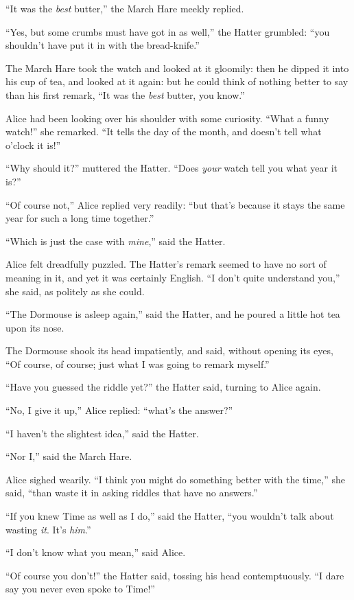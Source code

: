 \documentclass[book, 20pt]{extbook}
\begin{document}
``It was the \emph{best} butter,'' the March Hare meekly replied.

``Yes, but some crumbs must have got in as well,'' the Hatter grumbled:
``you shouldn't have put it in with the bread-knife.''

The March Hare took the watch and looked at it gloomily: then he dipped
it into his cup of tea, and looked at it again: but he could think of
nothing better to say than his first remark, ``It was the \emph{best}
butter, you know.''

Alice had been looking over his shoulder with some curiosity. ``What a
funny watch!'' she remarked. ``It tells the day of the month, and
doesn't tell what o'clock it is!''

``Why should it?'' muttered the Hatter. ``Does \emph{your} watch tell
you what year it is?''

``Of course not,'' Alice replied very readily: ``but that's because it
stays the same year for such a long time together.''

``Which is just the case with \emph{mine},'' said the Hatter.

Alice felt dreadfully puzzled. The Hatter's remark seemed to have no
sort of meaning in it, and yet it was certainly English. ``I don't quite
understand you,'' she said, as politely as she could.

``The Dormouse is asleep again,'' said the Hatter, and he poured a
little hot tea upon its nose.

The Dormouse shook its head impatiently, and said, without opening its
eyes, ``Of course, of course; just what I was going to remark myself.''

``Have you guessed the riddle yet?'' the Hatter said, turning to Alice
again.

``No, I give it up,'' Alice replied: ``what's the answer?''

``I haven't the slightest idea,'' said the Hatter.

``Nor I,'' said the March Hare.

Alice sighed wearily. ``I think you might do something better with the
time,'' she said, ``than waste it in asking riddles that have no
answers.''

``If you knew Time as well as I do,'' said the Hatter, ``you wouldn't
talk about wasting \emph{it}. It's \emph{him}.''

``I don't know what you mean,'' said Alice.

``Of course you don't!'' the Hatter said, tossing his head
contemptuously. ``I dare say you never even spoke to Time!''
\end{document}
